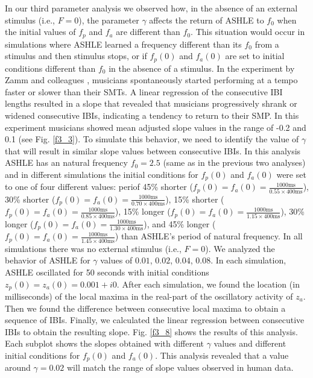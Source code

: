 \documentclass{report}
\begin{document}
In our third parameter analysis we observed how, in the absence of an external stimulus (i.e., $F = 0$), the parameter $\gamma$ affects the return of ASHLE to $f_0$ when the initial values of $f_p$ and $f_a$ are different than $f_0$. This situation would occur in simulations where ASHLE learned a frequency different than its $f_0$ from a stimulus and then stimulus stops, or if $f_p(0)$ and $f_a(0)$ are set to initial conditions different than $f_0$ in the absence of a stimulus. In the experiment by Zamm and colleagues \cite{zamm2018musicians}, musicians spontaneously started performing at a tempo faster or slower than their SMTs. A linear regression of the consecutive IBI lengths resulted in a slope that revealed that musicians progressively shrank or widened consecutive IBIs, indicating a tendency to return to their SMP. In this experiment musicians showed mean adjusted slope values in the range of -0.2 and 0.1 (see Fig.{} \ref{f3_3}). To simulate this behavior, we need to identify the value of $\gamma$ that will result in similar slope values between consecutive IBIs. In this analysis ASHLE has an natural frequency $f_0= 2.5$ (same as in the previous two analyses) and in different simulations the initial conditions for $f_p(0)$ and $f_a(0)$ were set to one of four different values: periof 45\% shorter ($f_p(0) = f_a(0) = \frac{1000\text{ms}}{0.55 \times 400\text{ms}}$), 30\% shorter ($f_p(0) = f_a(0) = \frac{1000\text{ms}}{0.70 \times 400\text{ms}}$), 15\% shorter ($f_p(0) = f_a(0) = \frac{1000\text{ms}}{0.85 \times 400\text{ms}}$), 15\% longer ($f_p(0) = f_a(0) = \frac{1000\text{ms}}{1.15 \times 400\text{ms}}$), 30\% longer ($f_p(0) = f_a(0) = \frac{1000\text{ms}}{1.30 \times 400\text{ms}}$), and 45\% longer ($f_p(0) = f_a(0) = \frac{1000\text{ms}}{1.45 \times 400\text{ms}}$) than ASHLE's period of natural frequency. In all simulations there was no external stimulus (i.e., $F = 0$). We analyzed the behavior of ASHLE for $\gamma$ values of $0.01$, $0.02$, $0.04$, $0.08$. In each simulation, ASHLE oscillated for 50 seconds with initial conditions $z_p(0)=z_a(0)=0.001 + i0$. After each simulation, we found the location (in milliseconds) of the local maxima in the real-part of the oscillatory activity of $z_a$. Then we found the difference between consecutive local maxima to obtain a sequence of IBIs. Finally, we calculated the linear regression between consecutive IBIs to obtain the resulting slope. Fig.{} \ref{f3_8} shows the results of this analysis. Each subplot shows the slopes obtained with different $\gamma$ values and different initial conditions for $f_p(0)$ and $f_a(0)$. This analysis revealed that a value around $\gamma= 0.02$ will match the range of slope values observed in human data.
\end{document}
